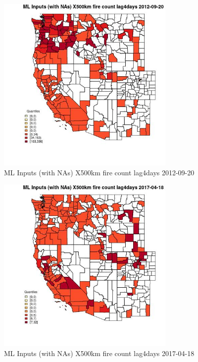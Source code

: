 \begin{figure} 
\centering  
\includegraphics[width=0.77\textwidth]{Code_Outputs/Report_ML_input_PM25_Step4_part_e_de_duplicated_aves_compiled_2019-05-14wNAs_CountyX500km_fire_count_lag4daysMean2012-09-20_2012-09-20.jpg} 
\caption{\label{fig:Report_ML_input_PM25_Step4_part_e_de_duplicated_aves_compiled_2019-05-14wNAsCountyX500km_fire_count_lag4daysMean2012-09-20_2012-09-20}ML Inputs (with NAs) X500km fire count lag4days 2012-09-20} 
\end{figure} 
 

\begin{figure} 
\centering  
\includegraphics[width=0.77\textwidth]{Code_Outputs/Report_ML_input_PM25_Step4_part_e_de_duplicated_aves_compiled_2019-05-14wNAs_CountyX500km_fire_count_lag4daysMean2017-04-18_2017-04-18.jpg} 
\caption{\label{fig:Report_ML_input_PM25_Step4_part_e_de_duplicated_aves_compiled_2019-05-14wNAsCountyX500km_fire_count_lag4daysMean2017-04-18_2017-04-18}ML Inputs (with NAs) X500km fire count lag4days 2017-04-18} 
\end{figure} 
 

